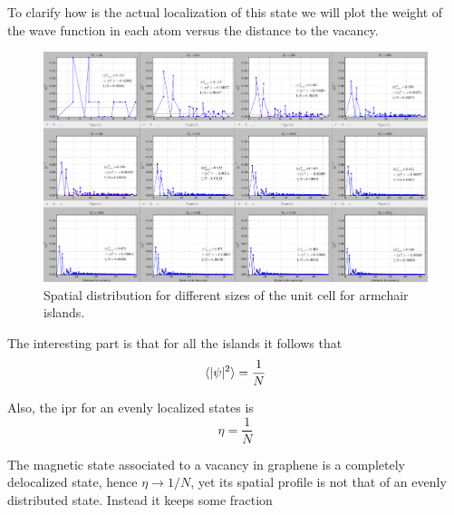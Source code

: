 To clarify how is the actual localization of this state we will plot the weight of the wave function in each atom versus the distance to the vacancy.
\begin{figure}[h!]
\centering
\includegraphics[width=1\textwidth]{chapter05/figures/spatial_distribution.png}
\vspace{-5pt}
\caption{Spatial distribution for different sizes of the unit cell for armchair islands.}
\end{figure}
\FloatBarrier
The interesting part is that for all the islands it follows that
\begin{equation}
  \langle|\psi|^2\rangle = \frac{1}{N}
\end{equation}

Also, the ipr for an evenly localized states is
\begin{equation}
  \eta = \frac{1}{N}
\end{equation}





The magnetic state associated to a vacancy in graphene is a completely delocalized state, hence $\eta\rightarrow1/N$, yet its spatial profile is not that of an evenly distributed state. Instead it keeps some fraction


